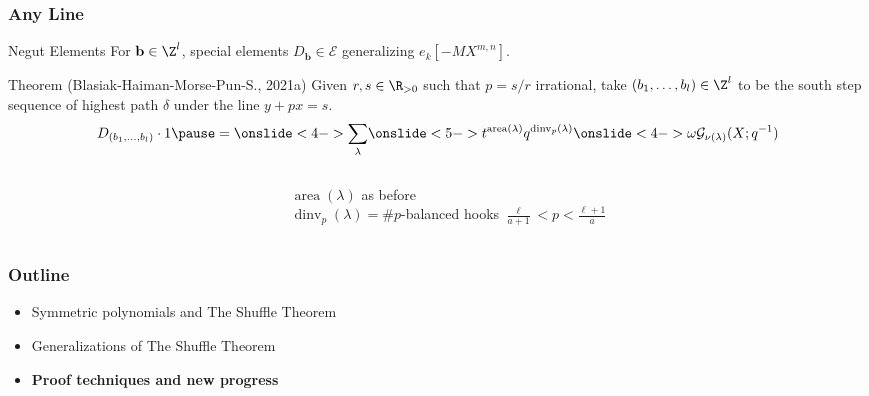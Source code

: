 \documentclass{beamer}
\DeclareMathOperator{\area}{area}
\DeclareMathOperator{\dinv}{dinv}
\newcommand{\Gcal}{\mathcal{G}}
\newcommand{\Ecal}{{\mathcal E}}
\newcommand{\bb}{{\mathbf b}}
\newcounter{c}
\begin{document}
\begin{frame}
  \frametitle{Any Line}
  \begin{block}{Negut Elements}
    For \(\bb \in \Z^l\), special elements \(D_\bb \in
    \Ecal\) generalizing \(e_k[-MX^{m,n}]\).
  \end{block}
  \pause
  \begin{block}{Theorem (Blasiak-Haiman-Morse-Pun-S., 2021a)}
    Given \(r,s \in \R_{>0}\) such that \(p = s/r\) irrational, take
    \((b_1,\ldots,b_l) \in \Z^l\) to be the south step sequence of highest path
    \(\delta\) under the line \(y+px=s\).
    \pause \[
      D_{(b_1,\ldots,b_l)} \cdot 1 \pause =
      \onslide<4->{\sum_{\lambda}}\onslide<5->
      {
        t^{\area(\lambda)}
        q^{\dinv_p(\lambda)}}\onslide<4->{\omega \Gcal_{\nu(\lambda)}(X;q^{-1})}
    \]
  \end{block}\pause
  \begin{columns}
    \begin{column}{0.2\textwidth}
    \end{column}
    \begin{column}{0.8\textwidth}
      \(\area(\lambda)\) as before\\
      \(\dinv_p(\lambda) = \# p\)-balanced hooks \(\frac{\ell}{a+1} < p <
      \frac{\ell+1}{a}\)
    \end{column}
  \end{columns}
\end{frame}
\begin{frame}
  \frametitle{Outline}
  \begin{itemize}
  \item Symmetric polynomials and The Shuffle Theorem
  \item Generalizations of The Shuffle Theorem
  \item {\bf Proof techniques and new progress}
  \end{itemize}
\end{frame}
\end{document}
